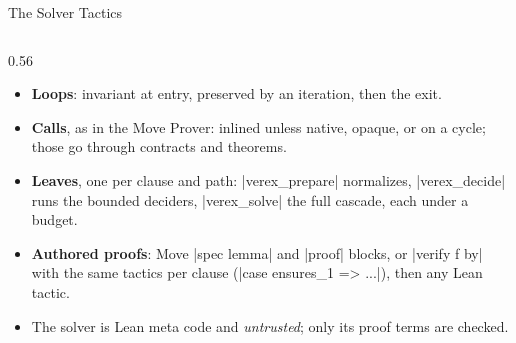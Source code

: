 \documentclass[aspectratio=169,11pt]{beamer}
\begin{document}
\begin{frame}[fragile]{The Solver Tactics}
\begin{columns}[c]
    \begin{column}{0.56\textwidth}
      \begin{itemize}\setlength{\itemsep}{2pt}\small
        \item \textbf{Loops}: invariant at entry, preserved by an iteration, then the exit.
        \item \textbf{Calls}, as in the Move Prover: inlined unless native, opaque, or on a cycle; those go through contracts and theorems.
        \item \textbf{Leaves}, one per clause and path: |verex_prepare| normalizes, |verex_decide| runs the bounded deciders, |verex_solve| the full cascade, each under a budget.
        \item \textbf{Authored proofs}: Move |spec lemma| and |proof| blocks, or |verify f by| with the same tactics per clause (|case ensures_1 => ...|), then any Lean tactic.
        \item The solver is Lean meta code and \emph{untrusted}; only its proof terms are checked.
      \end{itemize}
    \end{column}
  \end{columns}
\end{frame}
\end{document}
